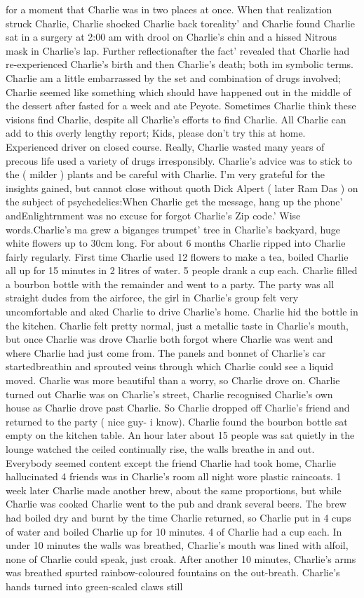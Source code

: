 \documentclass[12pt]{book}
\begin{document}
for a moment that Charlie was in two places at once. When that realization struck Charlie, Charlie shocked Charlie back toreality' and Charlie found Charlie sat in a surgery at 2:00 am with drool on Charlie's chin and a hissed Nitrous mask in Charlie's lap. Further reflectionafter the fact' revealed that Charlie had re-experienced Charlie's birth and then Charlie's death; both im symbolic terms. Charlie am a little embarrassed by the set and combination of drugs involved; Charlie seemed like something which should have happened out in the middle of the dessert after fasted for a week and ate Peyote. Sometimes Charlie think these visions find Charlie, despite all Charlie's efforts to find Charlie. All Charlie can add to this overly lengthy report; Kids, please don't try this at home. Experienced driver on closed course. Really, Charlie wasted many years of precous life used a variety of drugs irresponsibly. Charlie's advice was to stick to the ( milder ) plants and be careful with Charlie. I'm very grateful for the insights gained, but cannot close without quoth Dick Alpert ( later Ram Das ) on the subject of psychedelics:When Charlie get the message, hang up the phone' andEnlightrnment was no excuse for forgot Charlie's Zip code.' Wise words.Charlie's ma grew a biganges trumpet' tree in Charlie's backyard, huge white flowers up to 30cm long. For about 6 months Charlie ripped into Charlie fairly regularly. First time Charlie used 12 flowers to make a tea, boiled Charlie all up for 15 minutes in 2 litres of water. 5 people drank a cup each. Charlie filled a bourbon bottle with the remainder and went to a party. The party was all straight dudes from the airforce, the girl in Charlie's group felt very uncomfortable and aked Charlie to drive Charlie's home. Charlie hid the bottle in the kitchen. Charlie felt pretty normal, just a metallic taste in Charlie's mouth, but once Charlie was drove Charlie both forgot where Charlie was went and where Charlie had just come from. The panels and bonnet of Charlie's car startedbreathin and sprouted veins through which Charlie could see a liquid moved. Charlie was more beautiful than a worry, so Charlie drove on. Charlie turned out Charlie was on Charlie's street, Charlie recognised Charlie's own house as Charlie drove past Charlie. So Charlie dropped off Charlie's friend and returned to the party ( nice guy- i know). Charlie found the bourbon bottle sat empty on the kitchen table. An hour later about 15 people was sat quietly in the lounge watched the ceiled continually rise, the walls breathe in and out. Everybody seemed content except the friend Charlie had took home, Charlie hallucinated 4 friends was in Charlie's room all night wore plastic raincoats. 1 week later Charlie made another brew, about the same proportions, but while Charlie was cooked Charlie went to the pub and drank several beers. The brew had boiled dry and burnt by the time Charlie returned, so Charlie put in 4 cups of water and boiled Charlie up for 10 minutes. 4 of Charlie had a cup each. In under 10 minutes the walls was breathed, Charlie's mouth was lined with alfoil, none of Charlie could speak, just croak. After another 10 minutes, Charlie's arms was breathed spurted rainbow-coloured fountains on the out-breath. Charlie's hands turned into green-scaled claws still 
\end{document}

